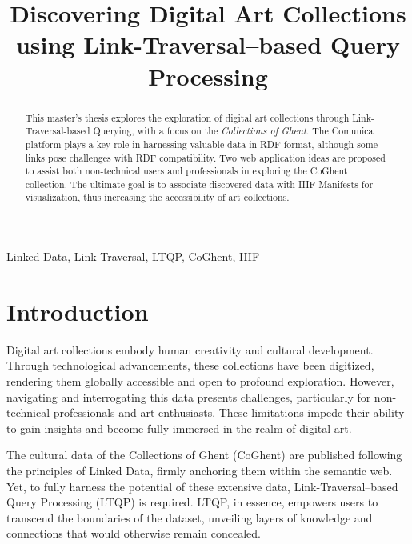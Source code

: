 \documentclass[conference]{IEEEtran}
\begin{document}

\title{Discovering Digital Art Collections using Link-Traversal–based Query Processing}

\author{
}

\maketitle

\begin{abstract}
This master's thesis explores the exploration of digital art collections through Link-Traversal-based Querying, with a focus on the \textit{Collections of Ghent}. The Comunica platform plays a key role in harnessing valuable data in RDF format, although some links pose challenges with RDF compatibility. Two web application ideas are proposed to assist both non-technical users and professionals in exploring the CoGhent collection. The ultimate goal is to associate discovered data with IIIF Manifests for visualization, thus increasing the accessibility of art collections.
\end{abstract}

\begin{IEEEkeywords}
Linked Data, Link Traversal, LTQP, CoGhent, IIIF
\end{IEEEkeywords}

\section*{Introduction}
Digital art collections embody human creativity and cultural development. Through technological advancements, these collections have been digitized, rendering them globally accessible and open to profound exploration. However, navigating and interrogating this data presents challenges, particularly for non-technical professionals and art enthusiasts. These limitations impede their ability to gain insights and become fully immersed in the realm of digital art.

The cultural data of the Collections of Ghent (CoGhent) are published following the principles of Linked Data, firmly anchoring them within the semantic web. Yet, to fully harness the potential of these extensive data, Link-Traversal–based Query Processing (LTQP) is required. LTQP, in essence, empowers users to transcend the boundaries of the dataset, unveiling layers of knowledge and connections that would otherwise remain concealed.
\end{document}
